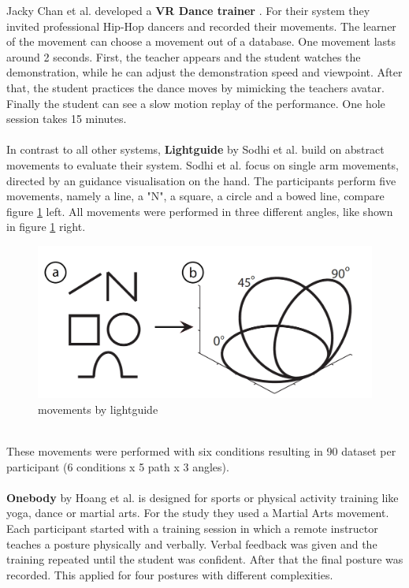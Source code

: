 Jacky Chan et al. developed a \textbf{VR Dance trainer} \cite{Chan2011}. For their system they invited professional Hip-Hop dancers and recorded their movements. The learner of the movement can choose a movement out of a database. One movement lasts around 2 seconds. First, the teacher appears and the student watches the demonstration, while he can adjust the demonstration speed and viewpoint. After that, the student practices the dance moves by mimicking the teachers avatar. Finally the student can see a slow motion replay of the performance. One hole session takes 15 minutes.\\ \\
In contrast to all other systems, \textbf{Lightguide} by Sodhi et al. \cite{Sodhi2012} build on abstract movements to evaluate their system. Sodhi et al. focus on single arm movements, directed by an guidance visualisation on the hand. The participants perform five movements, namely a line, a "N", a square, a circle and a bowed line, compare figure \ref{fig:lightguide1} left. All movements were performed in three different angles, like shown in figure \ref{fig:lightguide1} right.
\begin{figure}
	\centering
	\includegraphics[width=1.0\textwidth]{img/lightguide_movements.PNG}
	\caption{movements by lightguide \cite{Sodhi2012}}
	\label{fig:lightguide1}
\end{figure}\\
\todo These movements were performed with six conditions resulting in 90 dataset per participant (6 conditions x 5 path x 3 angles).\\
$ $\\
\textbf{Onebody} by Hoang et al. \cite{Hoang2016} is designed for sports or physical activity training like yoga, dance or martial arts. For the study they used a Martial Arts movement. Each participant started with a training session in which a remote instructor teaches a posture physically and verbally. Verbal feedback was given and the training repeated until the student was confident. After that the final posture was recorded. This applied for four postures with different complexities.\\ \\
